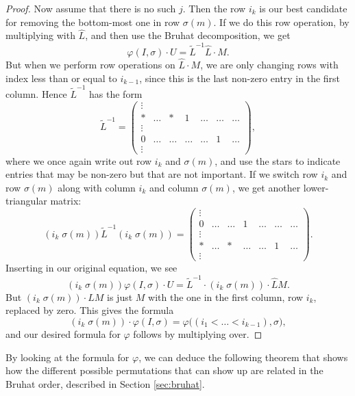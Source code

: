 \begin{proof}
  Now assume that there is no such $j$. Then the row $i_k$ is our best
  candidate for removing the bottom-most one in row $\sigma(m)$. If we
  do this row operation, by multiplying with $\widehat L$, and then
  use the
  Bruhat decomposition, we get
  \[ \varphi(I,\sigma)\cdot U = \widetilde{L}^{-1}\widehat{L} \cdot
  M. \]
  But when we perform row operations on $\widehat{L} \cdot M$, we are
  only changing rows with index less than or equal to $i_{k-1}$, since
  this is the last non-zero entry in the first column. Hence
  $\widetilde{L}^{-1}$
  has the form
  \[ \widetilde{L}^{-1} = 
  \begin{pmatrix}
    \vdots \\
    * & \dots & * & 1 & \dots & \dots & \dots \\
    \vdots \\
    0 & \dots & \dots & \dots & \dots & 1 & \dots \\
    \vdots
  \end{pmatrix},
  \]
  where we once again write out row $i_k$ and $\sigma(m)$, and use the
  stars to indicate entries that may be non-zero but that are not
  important.
  If we switch row $i_k$ and row $\sigma(m)$ along with column
  $i_k$ and column $\sigma(m)$, we get another lower-triangular
  matrix:
  \[ (i_k \; \sigma(m)) \widetilde{L}^{-1} (i_k \; \sigma(m)) = 
  \begin{pmatrix}
    \vdots \\
    0 & \dots & \dots & 1 & \dots & \dots & \dots \\
    \vdots \\
    * & \dots & * & \dots & \dots & 1 & \dots \\
    \vdots
  \end{pmatrix}.\]
  Inserting in our original equation, we see
  \[ (i_k \; \sigma(m)) \varphi(I,\sigma) \cdot U = \widetilde{L}^{-1}
  \cdot (i_k \; \sigma(m)) \cdot \widehat{L} M. \]
  But $(i_k \; \sigma(m)) \cdot \widehat{L} M$ is just $M$ with the
  one in the first column, row $i_k$, replaced by zero. This gives the
  formula
  \[ (i_k \; \sigma(m)) \cdot \varphi(I,\sigma) =
  \varphi\big((i_1<\dots<i_{k-1}),\sigma\big), \]
  and our desired formula for $\varphi$ follows by multiplying over.
\end{proof}

By looking at the formula for $\varphi$, we can deduce the following
theorem that shows how the different possible permutations that can
show up are related in the Bruhat order, described in Section
\ref{sec:bruhat}.

